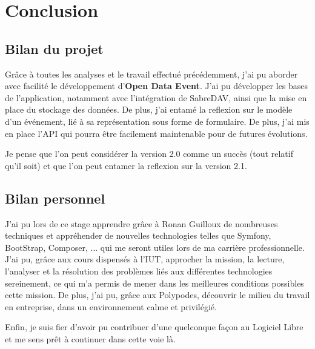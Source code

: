 \section*{Conclusion}

\subsection*{Bilan du projet}

Grâce à toutes les analyses et le travail effectué précédemment, j'ai pu aborder avec facilité le développement d'\textbf{Open Data Event}. J'ai pu développer les bases de l'application, notamment avec l'intégration de SabreDAV, ainsi que la mise en place du stockage des données. De plus, j'ai entamé la reflexion sur le modèle d'un événement, lié à sa représentation sous forme de formulaire. De plus, j'ai mis en place l'API qui pourra être facilement maintenable pour de futures évolutions.

Je pense que l'on peut considérer la version 2.0 comme un succès (tout relatif qu'il soit) et que l'on peut entamer la reflexion sur la version 2.1.

\subsection*{Bilan personnel}

J'ai pu lors de ce stage apprendre grâce à Ronan Guilloux de nombreuses techniques et appréhender de nouvelles technologies telles que Symfony, BootStrap, Composer, ... qui me seront utiles lors de ma carrière professionnelle. J'ai pu, grâce aux cours dispensés à l'IUT, approcher la mission, la lecture, l'analyser et la résolution des problèmes liés aux différentes technologies sereinement, ce qui m'a permis de mener dans les meilleures conditions possibles cette mission. De plus, j'ai pu, grâce aux Polypodes, découvrir le milieu du travail en entreprise, dans un environnement calme et privilégié. 

Enfin, je suis fier d'avoir pu contribuer d'une quelconque façon au Logiciel Libre et me sens prêt à continuer dans cette voie là.